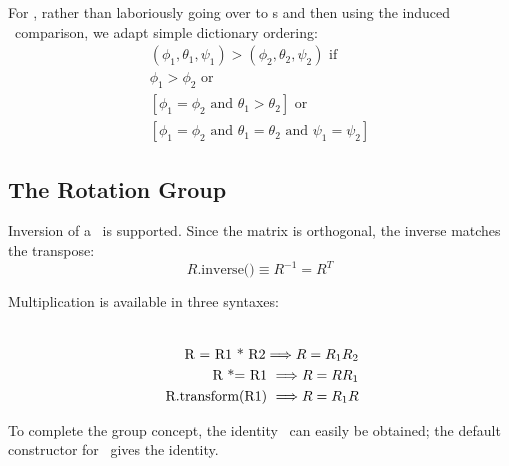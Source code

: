 For \Es, rather than laboriously going over to \Ro s and then using the
induced \Ax\ comparison, we adapt simple dictionary ordering:
\begin{eqnarray}
  ( \phi_1 , \theta_1, \psi_1 ) > ( \phi_2 , \theta_2, \psi_2 ) \mbox{ if }
	\nonumber \\
	\phi_1 > \phi_2  \mbox { or }
	\nonumber \\
	\left[
	\phi_1 = \phi_2  \mbox { and } 	\theta_1 > \theta_2  \right]
	\mbox { or }
	\nonumber \\
	\left[
	\phi_1 = \phi_2  \mbox { and } 	\theta_1 = \theta_2
	\mbox { and } \psi_1 = \psi_2
	\right]
\end{eqnarray}


\subsection{The Rotation Group}

Inversion of a \Ro\ is supported.  Since the matrix is orthogonal,
the inverse matches the transpose:
\[
  R\mbox{.inverse()} \equiv R^{-1} = R^T
\]

Multiplication is available in three syntaxes:

\begin{eqnarray}
\label{eq:opmulrot}
	\\
	\mbox{ R = R1 * R2} \Longrightarrow {\boldmath R = R_1 R_2}
\label{eq:opstrot}
	\\
	\mbox{ R *= R1 } \Longrightarrow {\boldmath R = R R_1 }
	\\
\label{eq:transrot}
	\mbox{ R.transform(R1) } \Longrightarrow {\boldmath R = R_1 R }
\end{eqnarray}

To complete the group concept, the identity \Ro\ can easily be obtained; the
default constructor for \Ro\ gives the identity.

